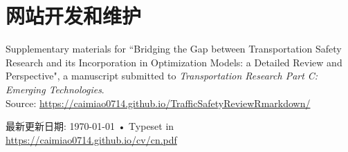 \documentclass[11pt, a4paper]{article}
\newcommand{\years}[1]{\marginnote{\scriptsize #1}}
\begin{document}
\section*{网站开发和维护}
\years{2019}Supplementary materials for ``Bridging the Gap between Transportation Safety Research and its Incorporation in Optimization Models: a Detailed Review and Perspective", a manuscript submitted to \emph{Transportation Research Part C: Emerging Technologies}.\\ Source: \href{https://caimiao0714.github.io/TrafficSafetyReviewRmarkdown/}{https://caimiao0714.github.io/TrafficSafetyReviewRmarkdown/}


\vfill{}

\begin{center}
{\scriptsize  最新更新日期: \today\- •\- 
Typeset in \href{https://caimiao0714.github.io/cv/cn.pdf}{
\XeTeX }\\
\href{https://caimiao0714.github.io/cv/cn.pdf}{https://caimiao0714.github.io/cv/cn.pdf}}
\end{center}
\end{document}
